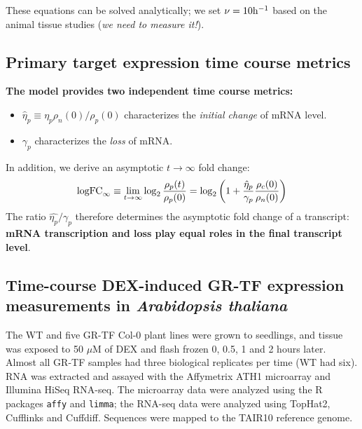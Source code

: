 \documentclass[aspb,landscape]{a0poster}
\begin{document}
\begin{multicols}{4}
  These equations can be solved analytically; we set $\nu=10 {\rm h}^{-1}$ based on the animal tissue studies (\textit{we need to measure it!}).
  
  \subsection*{Primary target expression time course metrics}
  
  \textbf{The model provides two independent time course metrics:}
  \begin{itemize}
  \item $\hat{\eta}_p  \equiv \eta_p \rho_n(0) / \rho_p(0)$ characterizes the \textit{initial change} of mRNA level.
  \item $\gamma_p$ characterizes the \textit{loss} of mRNA.
  \end{itemize}
  In addition, we derive an asymptotic $t$$\rightarrow$$\infty$ fold change:
  \begin{equation*}
    {\rm logFC}_\infty \equiv \lim_{t \to \infty} \log_2\frac{\rho_p(t)}{\rho_p(0)} = \log_2\left(1 + \frac{\hat{\eta}_p}{\gamma_p} \frac{\rho_c(0)}{\rho_n(0)} \right)
  \end{equation*}
  The ratio $\hat{\eta_p}/\gamma_p$ therefore determines the asymptotic fold change of a transcript: \textbf{mRNA transcription and loss play equal roles in the final transcript level}.

  \subsection*{Time-course DEX-induced GR-TF expression measurements in {\it Arabidopsis thaliana}}
  
  The WT and five GR-TF Col-0 plant lines were grown to seedlings, and tissue was exposed to 50 $\mu$M of DEX and flash frozen 0, 0.5, 1 and 2 hours later.
  Almost all GR-TF samples had three biological replicates per time (WT had six). RNA was extracted and assayed with the Affymetrix ATH1 microarray and Illumina HiSeq RNA-seq.
  The microarray data were analyzed using the R packages \texttt{affy} and \texttt{limma}; the RNA-seq data were analyzed using TopHat2, Cufflinks and Cuffdiff.
  Sequences were mapped to the TAIR10 reference genome.



\end{multicols}
\end{document}
